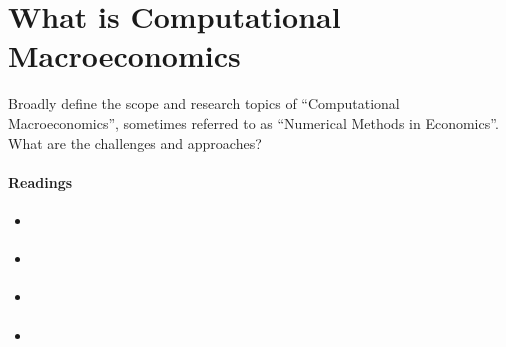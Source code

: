 \section[What is Computational Macroeconomics]{What is Computational Macroeconomics\label{ex:ComputationalMacroeconomics}}
Broadly define the scope and research topics of \enquote{Computational Macroeconomics}, 
	  sometimes referred to as \enquote{Numerical Methods in Economics}.
What are the challenges and approaches?

\paragraph{Readings}
\begin{itemize}
	\item \textcite[Part I]{Fernandez-Villaverde.Rubio-Ramirez.Schorfheide_2016_SolutionEstimationMethods}
	\item \textcite[Ch. 1]{Judd_1998_NumericalMethodsEconomics}
	\item \textcite{Maliar.Maliar_2014_NumericalMethodsLargeScale}
	\item \textcite[]{Schmedders.Judd_2014_IntroductionVolumeHandbook}
\end{itemize}

